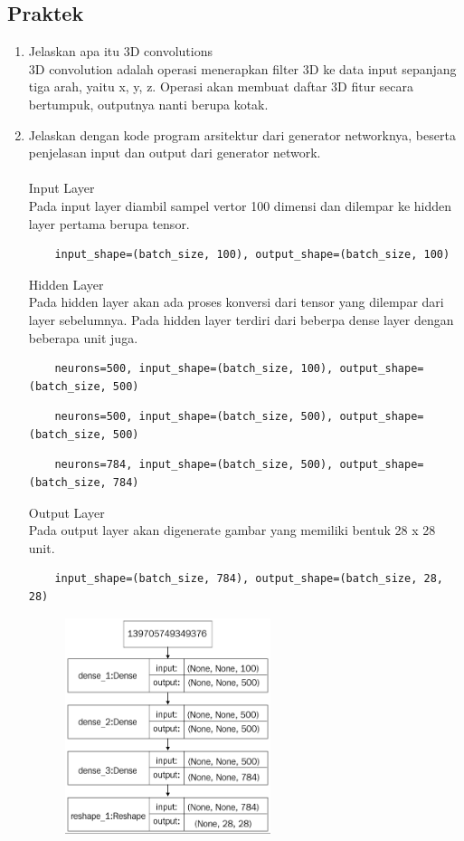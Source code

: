 \subsection{Praktek}
\begin{enumerate}
	\item Jelaskan apa itu 3D convolutions\\
	3D convolution adalah operasi menerapkan filter 3D ke data input sepanjang tiga arah, yaitu x, y, z. Operasi akan membuat daftar 3D fitur secara bertumpuk, outputnya nanti berupa kotak.
	
	\item Jelaskan dengan kode program arsitektur dari generator networknya, beserta penjelasan input dan output dari generator network.
	\\ \\
	Input Layer\\
	Pada input layer diambil sampel vertor 100 dimensi dan dilempar ke hidden layer pertama berupa tensor.\\
	\begin{lstlisting}
	input_shape=(batch_size, 100), output_shape=(batch_size, 100)
	\end{lstlisting}
	Hidden Layer\\
	Pada hidden layer akan ada proses konversi dari tensor yang dilempar dari layer sebelumnya. Pada hidden layer terdiri dari beberpa dense layer dengan beberapa unit juga.\\
	\begin{lstlisting}
	neurons=500, input_shape=(batch_size, 100), output_shape=(batch_size, 500)
	\end{lstlisting}
	\begin{lstlisting}
	neurons=500, input_shape=(batch_size, 500), output_shape=(batch_size, 500)
	\end{lstlisting}
	\begin{lstlisting}
	neurons=784, input_shape=(batch_size, 500), output_shape=(batch_size, 784)
	\end{lstlisting}
	Output Layer\\
	Pada output layer akan digenerate gambar yang memiliki bentuk 28 x 28 unit.\\
	\begin{lstlisting}
	input_shape=(batch_size, 784), output_shape=(batch_size, 28, 28)
	\end{lstlisting}
	\begin{figure}[H]
		\includegraphics[width=6cm]{figures/1174006/chapter8/teori/arc.png}
		\centering
	\end{figure}


\end{enumerate}
